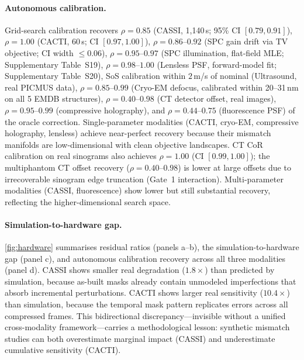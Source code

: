 \documentclass[11pt]{article}
\newcommand{\recoveryratio}{\rho}
\begin{document}
\paragraph{Autonomous calibration.}
Grid-search calibration recovers $\recoveryratio = 0.85$ (CASSI, 1{,}140\,s; 95\% CI $[0.79, 0.91]$), $\recoveryratio = 1.00$ (CACTI, 60\,s; CI $[0.97, 1.00]$), $\recoveryratio = 0.86$--$0.92$ (SPC gain drift via TV objective; CI width $\leq 0.06$), $\recoveryratio = 0.95$--$0.97$ (SPC illumination, flat-field MLE; Supplementary Table~S19), $\recoveryratio = 0.98$--$1.00$ (Lensless PSF, forward-model fit; Supplementary Table~S20), SoS calibration within $2$\,m/s of nominal (Ultrasound, real PICMUS data), $\recoveryratio = 0.85$--$0.99$ (Cryo-EM defocus, calibrated within 20--31\,nm on all 5 EMDB structures), $\recoveryratio = 0.40$--$0.98$ (CT detector offset, real images), $\recoveryratio = 0.95$--$0.99$ (compressive holography), and $\recoveryratio = 0.44$--$0.75$ (fluorescence PSF) of the oracle correction. Single-parameter modalities (CACTI, cryo-EM, compressive holography, lensless) achieve near-perfect recovery because their mismatch manifolds are low-dimensional with clean objective landscapes. CT CoR calibration on real sinograms also achieves $\recoveryratio = 1.00$ (CI $[0.99, 1.00]$); the multiphantom CT offset recovery ($\rho = 0.40$--$0.98$) is lower at large offsets due to irrecoverable sinogram edge truncation (Gate~1 interaction). Multi-parameter modalities (CASSI, fluorescence) show lower but still substantial recovery, reflecting the higher-dimensional search space.

\paragraph{Simulation-to-hardware gap.}
\cref{fig:hardware} summarises residual ratios (panels a--b), the simulation-to-hardware gap (panel c), and autonomous calibration recovery across all three modalities (panel d). CASSI shows smaller real degradation ($1.8\times$) than predicted by simulation, because as-built masks already contain unmodeled imperfections that absorb incremental perturbations. CACTI shows larger real sensitivity ($10.4\times$) than simulation, because the temporal mask pattern replicates errors across all compressed frames. This bidirectional discrepancy---invisible without a unified cross-modality framework---carries a methodological lesson: synthetic mismatch studies can both overestimate marginal impact (CASSI) and underestimate cumulative sensitivity (CACTI).
\end{document}
